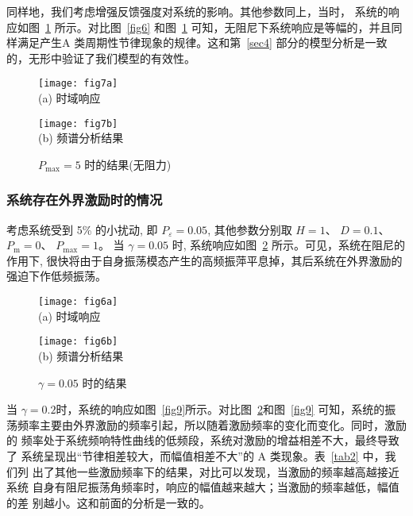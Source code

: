 \documentclass[withoutpreface,bwprint]{cumcmthesis} %
\begin{document}
同样地，我们考虑增强反馈强度对系统的影响。其他参数同上，当时，
系统的响应如图~\ref{fig7} 所示。对比图~\ref{fig6} 和图~\ref{fig7} 可知，无阻尼下系统响应是等幅的，并且同样满足产生A 类周期性节律现象的规律。这和第~\ref{sec4} 部分的模型分析是一致
的，无形中验证了我们模型的有效性。

\begin{figure}[h!t]
\begin{minipage}{0.48\linewidth}
  \centering
  {
  \texttt{[image: fig7a]}\\
  (a) 时域响应
  }
\end{minipage}\hfill
\begin{minipage}{0.48\linewidth}
  \centering
  {
  \texttt{[image: fig7b]}\\
  (b) 频谱分析结果
  }
\end{minipage}
    \caption{$P_{\max}=5$ 时的结果(无阻力)}
    \label{fig7}
    \end{figure}


\subsubsection{系统存在外界激励时的情况}
\label{sec5-2-2}

考虑系统受到 5\%  的小扰动, 即 $ P_{\varepsilon}=0.05 $, 其他参数分别取 $ H=1 $、 $D=0.1  $、  $P_{\mathrm{m}}=0 $、 $P_{\max }=1  $。 当  $\gamma=0.05$  时, 系统响应如图~\ref{fig8} 所示。可见，系统在阻尼的作用下, 很快将由于自身振荡模态产生的高频振萍平息掉，其后系统在外界激励的 强迫下作低频振荡。

\begin{figure}[h!t]
\begin{minipage}{0.48\linewidth}
  \centering
  {
  \texttt{[image: fig6a]}\\
  (a) 时域响应
  }
\end{minipage}\hfill
\begin{minipage}{0.48\linewidth}
  \centering
  {
  \texttt{[image: fig6b]}\\
  (b) 频谱分析结果
  }
\end{minipage}
    \caption{$\gamma=0.05$ 时的结果}
    \label{fig8}
    \end{figure}

当 $\gamma = 0.2$时，系统的响应如图~\ref{fig9}所示。对比图~\ref{fig8}和图~\ref{fig9} 可知，系统的振荡频率主要由外界激励的频率引起，所以随着激励频率的变化而变化。同时，激励的
频率处于系统频响特性曲线的低频段，系统对激励的增益相差不大，最终导致了
系统呈现出“节律相差较大，而幅值相差不大”的 A 类现象。表~\ref{tab2} 中，我们列
出了其他一些激励频率下的结果，对比可以发现，当激励的频率越高越接近系统
自身有阻尼振荡角频率时，响应的幅值越来越大；当激励的频率越低，幅值的差
别越小。这和前面的分析是一致的。
\end{document}
